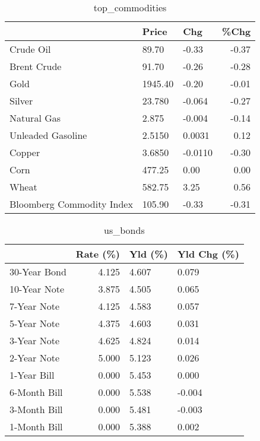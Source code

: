 \documentclass{article}%
\begin{document}
\begin{table}[htbp]%
\caption{top\_commodities}%
\centering%
\begin{adjustbox}{width=1\textwidth}%
\begin{tabular}{lllr}
\toprule
                          &   Price &     Chg &  \%Chg \\
\midrule
               Crude Oil  &   89.70 &   -0.33 & -0.37 \\
             Brent Crude  &   91.70 &   -0.26 & -0.28 \\
                    Gold  & 1945.40 &   -0.20 & -0.01 \\
                  Silver  &  23.780 &  -0.064 & -0.27 \\
             Natural Gas  &   2.875 &  -0.004 & -0.14 \\
       Unleaded Gasoline  &  2.5150 &  0.0031 &  0.12 \\
                  Copper  &  3.6850 & -0.0110 & -0.30 \\
                    Corn  &  477.25 &    0.00 &  0.00 \\
                   Wheat  &  582.75 &    3.25 &  0.56 \\
Bloomberg Commodity Index &  105.90 &   -0.33 & -0.31 \\
\bottomrule
\end{tabular}
%
\end{adjustbox}%
\end{table}

%


\begin{table}[htbp]%
\caption{us\_bonds}%
\centering%
\begin{adjustbox}{width=1\textwidth}%
\begin{tabular}{lrll}
\toprule
             &  Rate (\%) & Yld (\%) & Yld Chg (\%) \\
\midrule
30-Year Bond &     4.125 &   4.607 &       0.079 \\
10-Year Note &     3.875 &   4.505 &       0.065 \\
 7-Year Note &     4.125 &   4.583 &       0.057 \\
 5-Year Note &     4.375 &   4.603 &       0.031 \\
 3-Year Note &     4.625 &   4.824 &       0.014 \\
 2-Year Note &     5.000 &   5.123 &       0.026 \\
 1-Year Bill &     0.000 &   5.453 &       0.000 \\
6-Month Bill &     0.000 &   5.538 &      -0.004 \\
3-Month Bill &     0.000 &   5.481 &      -0.003 \\
1-Month Bill &     0.000 &   5.388 &       0.002 \\
\bottomrule
\end{tabular}
%
\end{adjustbox}%
\end{table}
\end{document}
